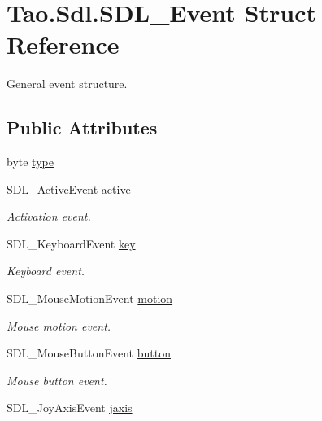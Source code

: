 \hypertarget{struct_tao_1_1_sdl_1_1_s_d_l___event}{
\section{Tao.Sdl.SDL\_\-Event Struct Reference}
\label{struct_tao_1_1_sdl_1_1_s_d_l___event}
}


General event structure.  


\subsection*{Public Attributes}
\begin{DoxyCompactItemize}
\item 
byte \hyperlink{struct_tao_1_1_sdl_1_1_s_d_l___event_a6061c378c3dc12067237f777c8504cb3}{type}
\item 
SDL\_\-ActiveEvent \hyperlink{struct_tao_1_1_sdl_1_1_s_d_l___event_acc827c48f34423b4f53f916de7426e4c}{active}
\begin{DoxyCompactList}\small\item\em Activation event. \item\end{DoxyCompactList}\item 
SDL\_\-KeyboardEvent \hyperlink{struct_tao_1_1_sdl_1_1_s_d_l___event_a498e1a2f220554305afec46e16701f35}{key}
\begin{DoxyCompactList}\small\item\em Keyboard event. \item\end{DoxyCompactList}\item 
SDL\_\-MouseMotionEvent \hyperlink{struct_tao_1_1_sdl_1_1_s_d_l___event_a9fa1e6078e9d70719f4393ab08643d35}{motion}
\begin{DoxyCompactList}\small\item\em Mouse motion event. \item\end{DoxyCompactList}\item 
SDL\_\-MouseButtonEvent \hyperlink{struct_tao_1_1_sdl_1_1_s_d_l___event_a0e57a9bed65a5af87dd434091562b24f}{button}
\begin{DoxyCompactList}\small\item\em Mouse button event. \item\end{DoxyCompactList}\item 
SDL\_\-JoyAxisEvent \hyperlink{struct_tao_1_1_sdl_1_1_s_d_l___event_afccc6a9dae0a4a2effdcf1628f8b93fa}{jaxis}

\end{DoxyCompactItemize}
